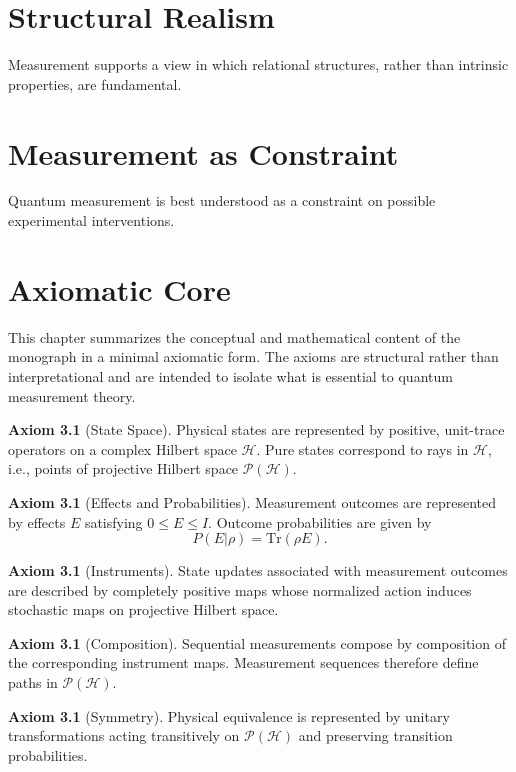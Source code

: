 \documentclass[12pt]{book}
\theoremstyle{plain}
\theoremstyle{definition}
\newtheorem{axiom}[theorem]{Axiom}
\theoremstyle{remark}
\begin{document}
\chapter{Structural Realism}
Measurement supports a view in which relational structures, rather than intrinsic properties, are fundamental.

\chapter{Measurement as Constraint}
Quantum measurement is best understood as a constraint on possible experimental interventions.

\chapter{Axiomatic Core}

This chapter summarizes the conceptual and mathematical content of the monograph in a minimal axiomatic form. The axioms are structural rather than interpretational and are intended to isolate what is essential to quantum measurement theory.

\begin{axiom}[State Space]
Physical states are represented by positive, unit-trace operators on a complex Hilbert space $\mathcal{H}$. Pure states correspond to rays in $\mathcal{H}$, i.e., points of projective Hilbert space $\mathcal{P}(\mathcal{H})$.
\end{axiom}

\begin{axiom}[Effects and Probabilities]
Measurement outcomes are represented by effects $E$ satisfying $0 \le E \le I$. Outcome probabilities are given by
\[
P(E|\rho)=\mathrm{Tr}(\rho E).
\]
\end{axiom}

\begin{axiom}[Instruments]
State updates associated with measurement outcomes are described by completely positive maps whose normalized action induces stochastic maps on projective Hilbert space.
\end{axiom}

\begin{axiom}[Composition]
Sequential measurements compose by composition of the corresponding instrument maps. Measurement sequences therefore define paths in $\mathcal{P}(\mathcal{H})$.
\end{axiom}

\begin{axiom}[Symmetry]
Physical equivalence is represented by unitary transformations acting transitively on $\mathcal{P}(\mathcal{H})$ and preserving transition probabilities.
\end{axiom}
\end{document}
